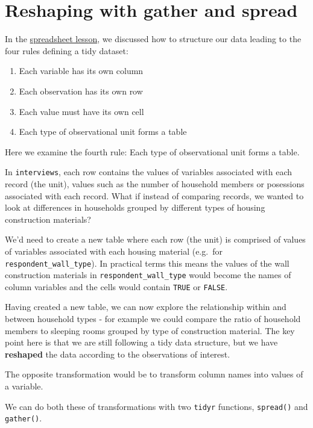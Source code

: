 \documentclass[]{book}
\providecommand{\tightlist}{%
  \setlength{\itemsep}{0pt}\setlength{\parskip}{0pt}}
\begin{document}
\section{Reshaping with gather and
spread}\label{reshaping-with-gather-and-spread}

In the
\href{http://www.datacarpentry.org/spreadsheets-socialsci/}{spreadsheet
lesson}, we discussed how to structure our data leading to the four
rules defining a tidy dataset:

\begin{enumerate}
\def\labelenumi{\arabic{enumi}.}
\tightlist
\item
  Each variable has its own column
\item
  Each observation has its own row
\item
  Each value must have its own cell
\item
  Each type of observational unit forms a table
\end{enumerate}

Here we examine the fourth rule: Each type of observational unit forms a
table.

In \texttt{interviews}, each row contains the values of variables
associated with each record (the unit), values such as the number of
household members or posessions associated with each record. What if
instead of comparing records, we wanted to look at differences in
households grouped by different types of housing construction materials?

We'd need to create a new table where each row (the unit) is comprised
of values of variables associated with each housing material (e.g.~for
\texttt{respondent\_wall\_type}). In practical terms this means the
values of the wall construction materials in
\texttt{respondent\_wall\_type} would become the names of column
variables and the cells would contain \texttt{TRUE} or \texttt{FALSE}.

Having created a new table, we can now explore the relationship within
and between household types - for example we could compare the ratio of
household members to sleeping rooms grouped by type of construction
material. The key point here is that we are still following a tidy data
structure, but we have \textbf{reshaped} the data according to the
observations of interest.

The opposite transformation would be to transform column names into
values of a variable.

We can do both these of transformations with two \texttt{tidyr}
functions, \texttt{spread()} and \texttt{gather()}.
\end{document}
